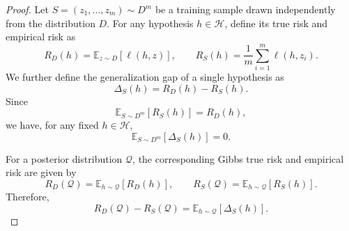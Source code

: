 \documentclass[10pt,a4paper]{amsart}
\begin{document}
\begin{proof}
Let $S=(z_1,\ldots,z_m)\sim D^m$ be a training sample drawn independently from the distribution $D$. For any hypothesis $h\in\mathcal H$, define its true risk and empirical risk as
\begin{equation}
R_D(h)=\mathbb E_{z\sim D}[\ell(h,z)],
\qquad
R_S(h)=\frac{1}{m}\sum_{i=1}^m \ell(h,z_i).
\end{equation}
We further define the generalization gap of a single hypothesis as
\begin{equation}
\Delta_S(h)=R_D(h)-R_S(h).
\end{equation}
Since
\begin{equation}
\mathbb E_{S\sim D^m}[R_S(h)]
=
R_D(h),
\end{equation}
we have, for any fixed $h\in\mathcal H$,
\begin{equation}
\mathbb E_{S\sim D^m}[\Delta_S(h)]=0.
\end{equation}

For a posterior distribution $\mathcal Q$, the corresponding Gibbs true risk and empirical risk are given by
\begin{equation}
R_D(\mathcal Q)
=
\mathbb E_{h\sim\mathcal Q}[R_D(h)],
\qquad
R_S(\mathcal Q)
=
\mathbb E_{h\sim\mathcal Q}[R_S(h)].
\end{equation}
Therefore,
\begin{equation}
R_D(\mathcal Q)-R_S(\mathcal Q)
=
\mathbb E_{h\sim\mathcal Q}[\Delta_S(h)].
\end{equation}


\end{proof}
\end{document}
